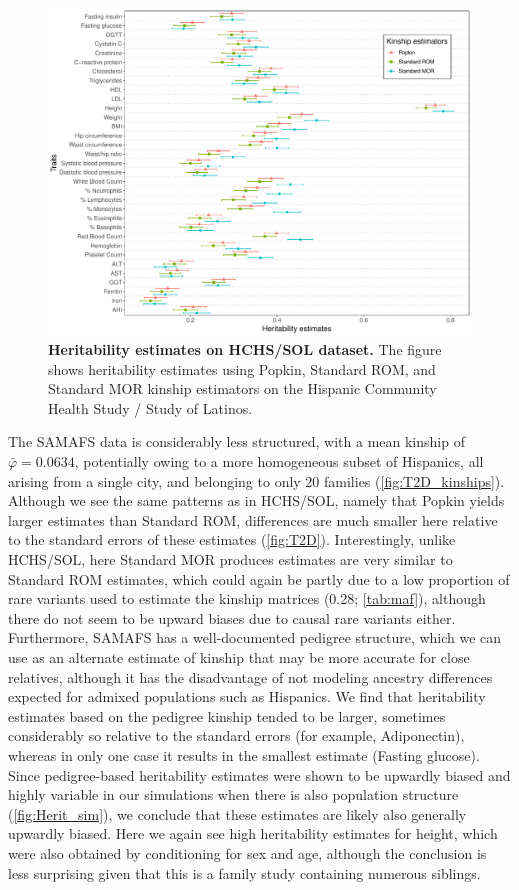 \documentclass[11pt]{article}
\begin{document}
\begin{figure}[bp!]
  \centering
  \includegraphics[width=\textwidth]{data/Fig2_HCHS_All_maf001_agesex.pdf}
  \caption{
    {\bf Heritability estimates on HCHS/SOL dataset.}
    The figure shows heritability estimates using Popkin, Standard ROM, and Standard MOR kinship estimators on the Hispanic Community Health Study / Study of Latinos.
    }
  \label{fig:HCHS}
\end{figure}

The SAMAFS data is considerably less structured, with a mean kinship of $\bar{\varphi} = 0.0634$, potentially owing to a more homogeneous subset of Hispanics, all arising from a single city, and belonging to only 20 families (\cref{fig:T2D_kinships}).
Although we see the same patterns as in HCHS/SOL, namely that Popkin yields larger estimates than Standard ROM, differences are much smaller here relative to the standard errors of these estimates (\cref{fig:T2D}).
Interestingly, unlike HCHS/SOL, here Standard MOR produces estimates are very similar to Standard ROM estimates, which could again be partly due to a low proportion of rare variants used to estimate the kinship matrices (0.28; \cref{tab:maf}), although there do not seem to be upward biases due to causal rare variants either.
Furthermore, SAMAFS has a well-documented pedigree structure, which we can use as an alternate estimate of kinship that may be more accurate for close relatives, although it has the disadvantage of not modeling ancestry differences expected for admixed populations such as Hispanics.
We find that heritability estimates based on the pedigree kinship tended to be larger, sometimes considerably so relative to the standard errors (for example, Adiponectin), whereas in only one case it results in the smallest estimate (Fasting glucose).
Since pedigree-based heritability estimates were shown to be upwardly biased and highly variable in our simulations when there is also population structure (\cref{fig:Herit_sim}), we conclude that these estimates are likely also generally upwardly biased.
Here we again see high heritability estimates for height, which were also obtained by conditioning for sex and age, although the conclusion is less surprising given that this is a family study containing numerous siblings.
\end{document}
